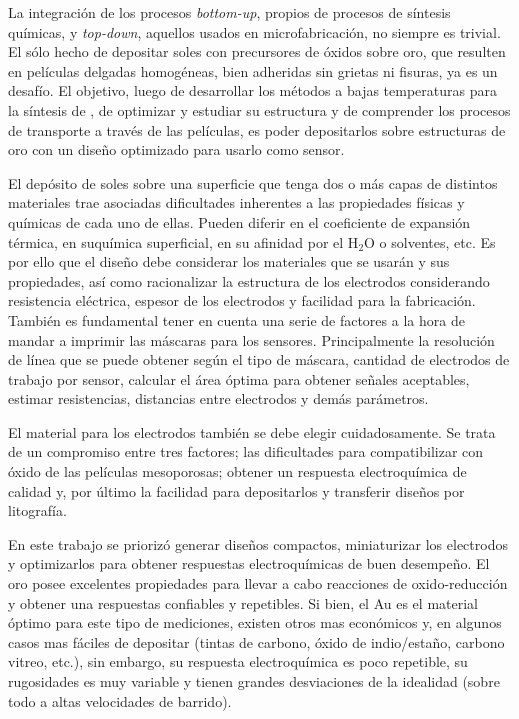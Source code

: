 	La integración de los procesos \textit{bottom-up}, propios de procesos de síntesis químicas, y \textit{top-down}, aquellos usados en microfabricación, no siempre es trivial. El sólo hecho de depositar soles con precursores de óxidos sobre oro, que resulten en películas delgadas homogéneas, bien adheridas sin grietas ni fisuras, ya es un desafío. El objetivo, luego de desarrollar los métodos a bajas temperaturas para la síntesis de \pdm, de optimizar y estudiar su estructura y de comprender los procesos de transporte a través de las películas, es poder depositarlos sobre estructuras de oro con un diseño optimizado para usarlo como sensor. 

	El depósito de soles sobre una superficie que tenga dos o más capas de distintos  materiales trae asociadas dificultades inherentes a las propiedades físicas y químicas de cada uno de ellas. Pueden diferir en el coeficiente de expansión térmica, en suquímica superficial, en su afinidad por el H$_2$O o solventes, etc.
	Es por ello que el diseño debe considerar los materiales que se usarán y sus propiedades, así como racionalizar la estructura de los electrodos considerando resistencia eléctrica, espesor de los electrodos y facilidad para la fabricación. También es fundamental tener en cuenta una serie de factores a la hora de mandar a imprimir las máscaras para los sensores. Principalmente la resolución de línea que se puede obtener según el tipo de máscara, cantidad de electrodos de trabajo por sensor, calcular el área óptima para obtener señales aceptables, estimar resistencias, distancias entre electrodos y demás parámetros.

	El material para los electrodos también se debe elegir cuidadosamente. Se trata de un compromiso entre tres factores; las dificultades para compatibilizar con óxido de las películas mesoporosas; obtener un respuesta electroquímica de calidad y, por último la facilidad para depositarlos y transferir diseños por litografía.

	En este trabajo se priorizó generar diseños compactos, miniaturizar los electrodos y optimizarlos para obtener respuestas electroquímicas de buen desempeño. El oro posee excelentes propiedades para llevar a cabo reacciones de oxido-reducción y obtener una respuestas confiables y repetibles. Si bien, el Au es el material óptimo para este tipo de mediciones, existen otros mas económicos y, en algunos casos mas fáciles de depositar (tintas de carbono, óxido de indio/estaño, carbono vitreo, etc.), sin embargo, su respuesta electroquímica es poco repetible, su rugosidades es muy variable y tienen grandes desviaciones de la idealidad (sobre todo a altas velocidades de barrido).\cite{Wi2000,Villullas2000}

